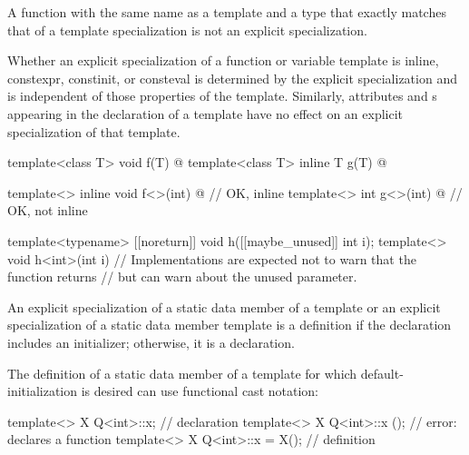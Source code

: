 \pnum
A function with the same name as a template and a type that exactly matches that
of a template specialization is not an explicit specialization.

\pnum
Whether an explicit specialization of a function or variable template
is inline, constexpr, constinit, or consteval
is determined by the explicit specialization and
is independent of those properties of the template.
Similarly,
attributes and s
appearing in the declaration of a template
have no effect on an explicit specialization of that template.
\begin{example}
\begin{codeblock}
template<class T> void f(T) { @\commentellip@ }
template<class T> inline T g(T) { @\commentellip@ }

template<> inline void f<>(int) { @\commentellip@ }   // OK, inline
template<> int g<>(int) { @\commentellip@ }           // OK, not inline

template<typename> [[noreturn]] void h([[maybe_unused]] int i);
template<> void h<int>(int i) {
    // Implementations are expected not to warn that the function returns
    // but can warn about the unused parameter.
}
\end{codeblock}
\end{example}

\pnum
An explicit specialization of a static data member of a template
or an explicit specialization of a static data member template is a
definition if the declaration includes an initializer;
otherwise, it is a declaration.
\begin{note}
The definition of a static data member of a template
for which default-initialization is desired
can use functional cast notation:

\begin{codeblock}
template<> X Q<int>::x;                         // declaration
template<> X Q<int>::x ();                      // error: declares a function
template<> X Q<int>::x = X();                   // definition
\end{codeblock}
\end{note}

